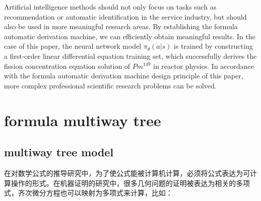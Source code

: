 \documentclass[runningheads]{llncs}
\begin{document}
Artificial intelligence methods should not only focus on tasks such as recommendation or automatic identification in the service industry, but should also be used in more meaningful research areas. By establishing the formula automatic derivation machine, we can efficiently obtain meaningful results. In the case of this paper, the neural network model $\pi_{\theta}(a|s)$ is trained by constructing a first-order linear differential equation training set, which successfully derives the fission concentration equation solution of $Pm^{149}$ in reactor physics. In accordance with the formula automatic derivation machine design principle of this paper, more complex professional scientific research problems can be solved.











\section{formula multiway tree}
\subsection{multiway tree model}
在对数学公式的推导研究中，为了使公式能被计算机计算，必须将公式表达为可计算操作的形式。在机器证明的研究中，很多几何问题的证明被表达为相关的多项式\cite{ref_proc1}，齐次微分方程也可以映射为多项式来计算，比如：
\end{document}

